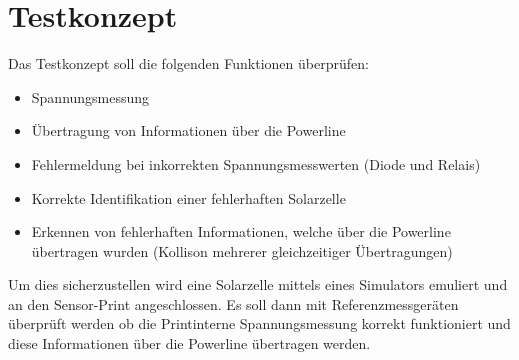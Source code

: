 %
%
%
\section{Testkonzept}

Das Testkonzept soll die folgenden Funktionen überprüfen:
\begin{itemize}
	\item Spannungsmessung
	\item Übertragung von Informationen über die Powerline
	\item Fehlermeldung bei inkorrekten Spannungsmesswerten (Diode und Relais)
	\item Korrekte Identifikation einer fehlerhaften Solarzelle
	\item Erkennen von fehlerhaften Informationen, welche über die Powerline übertragen wurden (Kollison mehrerer gleichzeitiger Übertragungen)
\end{itemize}

Um dies sicherzustellen wird eine Solarzelle mittels eines Simulators emuliert und an den Sensor-Print angeschlossen. Es soll dann mit Referenzmessgeräten überprüft werden ob die Printinterne Spannungsmessung korrekt funktioniert und diese Informationen über die Powerline übertragen werden.
%